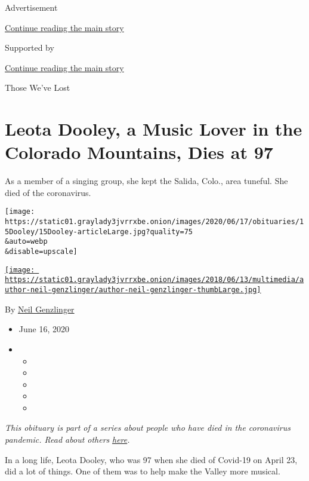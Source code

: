 Advertisement

\protect\hyperlink{after-top}{Continue reading the main story}

Supported by

\protect\hyperlink{after-sponsor}{Continue reading the main story}

Those We've Lost

\hypertarget{leota-dooley-a-music-lover-in-the-colorado-mountains-dies-at-97}{%
\section{Leota Dooley, a Music Lover in the Colorado Mountains, Dies at
97}\label{leota-dooley-a-music-lover-in-the-colorado-mountains-dies-at-97}}

As a member of a singing group, she kept the Salida, Colo., area
tuneful. She died of the coronavirus.

\texttt{[image: https://static01.graylady3jvrrxbe.onion/images/2020/06/17/obituaries/15Dooley/15Dooley-articleLarge.jpg?quality=75\\\&auto=webp\\\&disable=upscale]}

\href{https://www.nytimes3xbfgragh.onion/by/neil-genzlinger}{\texttt{[image: https://static01.graylady3jvrrxbe.onion/images/2018/06/13/multimedia/author-neil-genzlinger/author-neil-genzlinger-thumbLarge.jpg]}}

By \href{https://www.nytimes3xbfgragh.onion/by/neil-genzlinger}{Neil
Genzlinger}

\begin{itemize}
\item
  June 16, 2020
\item
  \begin{itemize}
  \item
  \item
  \item
  \item
  \item
  \end{itemize}
\end{itemize}

\emph{This obituary is part of a series about people who have died in
the coronavirus pandemic. Read about others}
\href{https://www.nytimes3xbfgragh.onion/interactive/2020/obituaries/people-died-coronavirus-obituaries.html}{\emph{here}}\emph{.}

In a long life, Leota Dooley, who was 97 when she died of Covid-19 on
April 23, did a lot of things. One of them was to help make the Valley
more musical.

